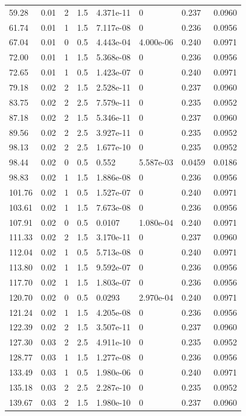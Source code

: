 \documentclass[preview]{standalone}
\begin{document}
{{\begin{tabular}{L{1.2cm}C{1.2cm} C{0.3cm}C{0.5cm} C{1.4cm}C{1.4cm} C{1.4cm}C{1.4cm}}
  59.28  &  0.01  & 2     & 1.5 &  4.371e-11  & 0  & 0.237 &  0.0960   \\ 
  61.74  &  0.01  & 1     & 1.5 &  7.117e-08  & 0  & 0.236 &  0.0956   \\ 
  67.04  &  0.01  & 0     & 0.5 &  4.443e-04  & 4.000e-06  & 0.240 &  0.0971   \\ 
  72.00  &  0.01  & 1     & 1.5 &  5.368e-08  & 0  & 0.236 &  0.0956   \\ 
  72.65  &  0.01  & 1     & 0.5 &  1.423e-07  & 0  & 0.240 &  0.0971   \\ 
  79.18  &  0.02  & 2     & 1.5 &  2.528e-11  & 0  & 0.237 &  0.0960   \\ 
  83.75  &  0.02  & 2     & 2.5 &  7.579e-11  & 0  & 0.235 &  0.0952   \\ 
  87.18  &  0.02  & 2     & 1.5 &  5.346e-11  & 0  & 0.237 &  0.0960   \\ 
  89.56  &  0.02  & 2     & 2.5 &  3.927e-11  & 0  & 0.235 &  0.0952   \\ 
  98.13  &  0.02  & 2     & 2.5 &  1.677e-10  & 0  & 0.235 &  0.0952   \\ 
  98.44  &  0.02  & 0     & 0.5 &  0.552  & 5.587e-03  & 0.0459 &  0.0186   \\ 
  98.83  &  0.02  & 1     & 1.5 &  1.886e-08  & 0  & 0.236 &  0.0956   \\ 
  101.76  &  0.02  & 1     & 0.5 &  1.527e-07  & 0  & 0.240 &  0.0971   \\ 
  103.61  &  0.02  & 1     & 1.5 &  7.673e-08  & 0  & 0.236 &  0.0956   \\ 
  107.91  &  0.02  & 0     & 0.5 &  0.0107  & 1.080e-04  & 0.240 &  0.0971   \\ 
  111.33  &  0.02  & 2     & 1.5 &  3.170e-11  & 0  & 0.237 &  0.0960   \\ 
  112.04  &  0.02  & 1     & 0.5 &  5.713e-08  & 0  & 0.240 &  0.0971   \\ 
  113.80  &  0.02  & 1     & 1.5 &  9.592e-07  & 0  & 0.236 &  0.0956   \\ 
  117.70  &  0.02  & 1     & 1.5 &  1.803e-07  & 0  & 0.236 &  0.0956   \\ 
  120.70  &  0.02  & 0     & 0.5 &  0.0293  & 2.970e-04  & 0.240 &  0.0971   \\ 
  121.24  &  0.02  & 1     & 1.5 &  4.205e-08  & 0  & 0.236 &  0.0956   \\ 
  122.39  &  0.02  & 2     & 1.5 &  3.507e-11  & 0  & 0.237 &  0.0960   \\ 
  127.30  &  0.03  & 2     & 2.5 &  4.911e-10  & 0  & 0.235 &  0.0952   \\ 
  128.77  &  0.03  & 1     & 1.5 &  1.277e-08  & 0  & 0.236 &  0.0956   \\ 
  133.49  &  0.03  & 1     & 0.5 &  1.980e-06  & 0  & 0.240 &  0.0971   \\ 
  135.18  &  0.03  & 2     & 2.5 &  2.287e-10  & 0  & 0.235 &  0.0952   \\ 
  139.67  &  0.03  & 2     & 1.5 &  1.980e-10  & 0  & 0.237 &  0.0960   \\ 
\hline 
\end{tabular} 

}}
\end{document}
